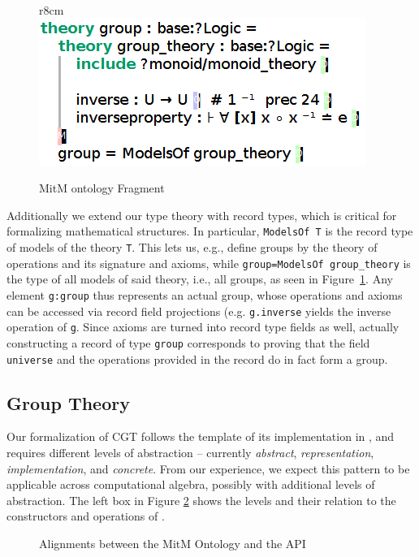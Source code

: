 \begin{figure}r{8cm}\vspace*{-1em}
  \includegraphics[width=.5\textwidth]{mitm1}
  \caption{MitM ontology Fragment}\label{fig:mitm1}
\end{figure}
Additionally we extend our type theory with record types, which is critical for formalizing mathematical structures.
In particular, \lstinline|ModelsOf T| is the record type of models of the theory \lstinline|T|.
This lets us, e.g., define groups by the theory of operations and its signature and axioms, while \lstinline|group=ModelsOf group_theory| is the type of all models of said theory, i.e., all groups, as seen in Figure~\ref{fig:mitm1}.
Any element \lstinline|g:group| thus represents an actual group, whose operations and axioms can be accessed via record field projections (e.g. \lstinline|g.inverse| yields the inverse operation of \lstinline|g|.
Since axioms are turned into record type fields as well, actually constructing a record of type \lstinline|group| corresponds to proving that the field \lstinline|universe| and the operations provided in the record do in fact form a group.

\subsection{Group Theory}

Our formalization of CGT follows the template of its implementation in \GAP, and requires different levels of abstraction -- currently \emph{abstract}, \emph{representation}, \emph{implementation}, and \emph{concrete}. From our experience, we expect this pattern to be applicable across computational algebra, possibly with additional levels of abstraction. 
The left box in Figure \ref{fig:cgtontology} shows the levels and their relation to the constructors and operations of \GAP.

\begin{figure}[ht]\centering
  \caption{Alignments between the MitM Ontology and the \GAP API}\label{fig:cgtontology}
\end{figure}

